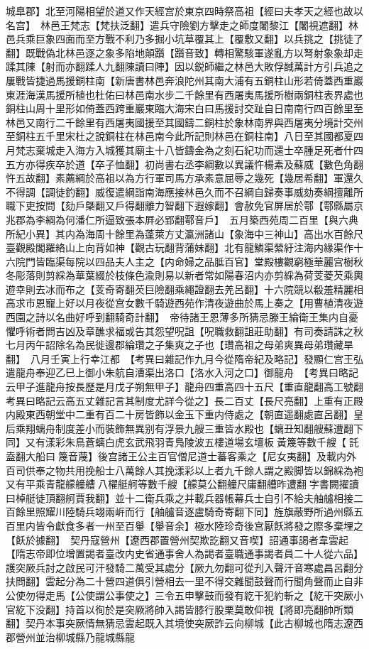 城臯郡】北至河陽相望於道又作天經宫於東京四時祭高祖【經曰夫孝天之經也故以名宫】　林邑王梵志【梵扶泛翻】遣兵守險劉方擊走之師度闍黎江【闍視遮翻】林邑兵乘巨象四面而至方戰不利乃多掘小坑草覆其上【覆敷又翻】以兵挑之【挑徒了翻】既戰偽北林邑逐之象多陷地顛躓【躓音致】轉相驚駭軍遂亂方以弩射象象却走蹂其陳【射而亦翻蹂人九翻陳讀曰陣】因以鋭師繼之林邑大敗俘馘萬計方引兵追之屢戰皆捷過馬援銅柱南【新唐書林邑奔浪陀州其南大浦有五銅柱山形若倚蓋西重巖東涯海漢馬援所植也杜佑曰林邑南水步二千餘里有西屠夷馬援所樹兩銅柱表界處也銅柱山周十里形如倚蓋西跨重巖東臨大海宋白曰馬援討交趾自日南南行四百餘里至林邑又南行二千餘里有西屠夷國援至其國鑄二銅柱於象林南界與西屠夷分境計交州至銅柱五千里宋杜之說銅柱在林邑南今此所記則林邑在銅柱南】八日至其國都夏四月梵志棄城走入海方入城獲其廟主十八皆鑄金為之刻石紀功而還士卒腫足死者什四五方亦得疾卒於道【卒子恤翻】初尚書右丞李綱數以異議忤楊素及蘇威【數色角翻忤五故翻】素薦綱於高祖以為方行軍司馬方承素意屈辱之幾死【幾居希翻】軍還久不得調【調徒釣翻】威復遣綱詣南海應接林邑久而不召綱自歸奏事威劾奏綱擅離所職下吏按問【劾戶槩翻又戶得翻離力智翻下遐嫁翻】會赦免官屏居於鄠【鄠縣屬京兆郡為李綱為何潘仁所逼致張本屛必郢翻鄠音戶】　五月築西苑周二百里【與六典所紀小異】其内為海周十餘里為蓬萊方丈瀛洲諸山【象海中三神山】高出水百餘尺臺觀殿閣羅絡山上向背如神【觀古玩翻背蒲妹翻】北有龍鱗渠縈紆注海内緣渠作十六院門皆臨渠每院以四品夫人主之【内命婦之品胝百官】堂殿樓觀窮極華麗宫樹秋冬彫落則剪綵為華葉綴於枝條色渝則易以新者常如陽春沼内亦剪綵為荷芰菱芡乘輿遊幸則去冰而布之【芰奇寄翻芡巨險翻乘繩證翻去羌呂翻】十六院競以殽羞精麗相高求市恩寵上好以月夜從宫女數千騎遊西苑作清夜遊曲於馬上奏之【用曹植清夜遊西園之詩以名曲好呼到翻騎奇計翻】　帝待諸王恩薄多所猜忌滕王綸衛王集内自憂懼呼術者問吉凶及章醮求福或告其怨望呪詛【呪職救翻詛莊助翻】有司奏請誅之秋七月丙午詔除名為民徙邊郡綸瓚之子集爽之子也【瓚高祖之母弟爽異母弟瓚藏旱翻】　八月壬寅上行幸江都　【考異曰雜記作九月今從隋帝紀及略記】發顯仁宫王弘遣龍舟奉迎乙巳上御小朱航自漕渠出洛口【洛水入河之口】御龍舟　【考異曰略記云甲子進龍舟按長歷是月戊子朔無甲子】龍舟四重高四十五尺【重直龍翻高工號翻　考異曰略記云高五丈雜記言其制度尤詳今從之】長二百丈【長尺亮翻】上重有正殿内殿東西朝堂中二重有百二十房皆飾以金玉下重内侍處之【朝直遥翻處直呂翻】皇后乘翔螭舟制度差小而裝飾無異别有浮景九艘三重皆水殿也【螭丑知翻艘蘇遭翻下同】又有漾彩朱鳥蒼螭白虎玄武飛羽青鳬陵波五樓道場玄壇板黃篾等數千艘【託盍翻大船曰篾音蔑】後宫諸王公主百官僧尼道士蕃客乘之【尼女夷翻】及載内外百司供奉之物共用挽船士八萬餘人其挽漾彩以上者九千餘人謂之殿脚皆以錦綵為袍又有平乘青龍艨艟艚八櫂艇舸等數千艘【艨莫公翻艟尺庸翻艚昨遭翻字書闕擢讀曰棹艇徒頂翻舸賈我翻】並十二衛兵乘之并載兵器帳幕兵士自引不給夫舳艫相接二百餘里照耀川陸騎兵翊兩㟁而行【舳艫音逐盧騎奇寄翻下同】旌旗蔽野所過州縣五百里内皆令獻食多者一州至百轝【轝音余】極水陸珍奇後宫厭飫將發之際多棄埋之【飫於據翻】　契丹寇營州【遼西郡置營州契欺訖翻又音喫】詔通事謁者韋雲起【隋志帝即位增置謁者臺改内史省通事舍人為謁者臺職通事謁者員二十人從六品】護突厥兵討之啟民可汗發騎二萬受其處分【厥九勿翻可從刋入聲汗音寒處昌呂翻分扶問翻】雲起分為二十營四道俱引營相去一里不得交雜聞鼓聲而行聞角聲而止自非公使勿得走馬【公使謂公事使之】三令五申擊鼓而發有紇干犯約斬之【紇干突厥小官紇下没翻】持首以徇於是突厥將帥入謁皆膝行股栗莫敢仰視【將即亮翻帥所類翻】契丹本事突厥情無猜忌雲起既入其境使突厥詐云向柳城【此古柳城也隋志遼西郡營州並治柳城縣乃龍城縣龍